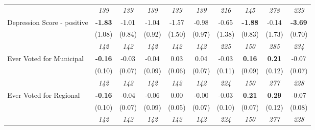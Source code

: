 \begin{tabular}{l c c c c c c c c c}
& \textit{ 139 } & \textit{ 139 } & \textit{ 139 } & \textit{ 139 } & \textit{ 139 } & \textit{ 216 } & \textit{ 145 } & \textit{ 278 } & \textit{ 229 } \\
Depression Score - positive & \textbf{ -1.83 } & -1.01 & -1.04 & -1.57 & -0.98 & -0.65 & \textbf{-1.88} & -0.14 & \textbf{-3.69} \\
& (1.08) & (0.84) & (0.92) & (1.50) & (0.97) & (1.38) & (0.83) & (1.73) & (0.70) \\
& \textit{ 142 } & \textit{ 142 } & \textit{ 142 } & \textit{ 142 } & \textit{ 142 } & \textit{ 225 } & \textit{ 150 } & \textit{ 285 } & \textit{ 234 } \\
Ever Voted for Municipal & \textbf{ -0.16 } & -0.03 & -0.04 & 0.03 & 0.04 & -0.03 & \textbf{0.16} & \textbf{ 0.21 } & -0.07 \\
& (0.10) & (0.07) & (0.09) & (0.06) & (0.07) & (0.11) & (0.09) & (0.12) & (0.07) \\
& \textit{ 142 } & \textit{ 142 } & \textit{ 142 } & \textit{ 142 } & \textit{ 142 } & \textit{ 224 } & \textit{ 150 } & \textit{ 277 } & \textit{ 228 } \\
Ever Voted for Regional & \textbf{ -0.16 } & -0.04 & -0.06 & 0.00 & -0.00 & -0.03 & \textbf{0.21} & \textbf{ 0.29 } & -0.07 \\
& (0.10) & (0.07) & (0.09) & (0.05) & (0.07) & (0.10) & (0.07) & (0.12) & (0.08) \\
& \textit{ 142 } & \textit{ 142 } & \textit{ 142 } & \textit{ 142 } & \textit{ 142 } & \textit{ 224 } & \textit{ 150 } & \textit{ 277 } & \textit{ 228 } \\
\bottomrule
\end{tabular}
